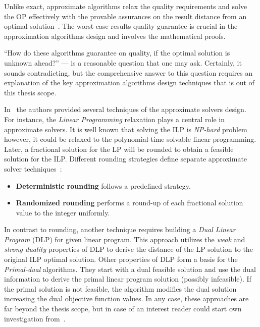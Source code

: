 Unlike exact, approximate algorithms relax the quality requirements and solve the OP effectively with the provable assurances on the result distance from an optimal solution~\cite{williamson2011design}. The worst-case results quality guarantee is crucial in the approximation algorithms design and involves the mathematical proofs.

``How do these algorithms guarantee on quality, if the optimal solution is unknown ahead?'' — is a reasonable question that one may ask. Certainly, it sounds contradicting, but the comprehensive answer to this question requires an explanation of the key approximation algorithms design techniques that is out of this thesis scope.

In~\cite{williamson2011design} the authors provided several techniques of the approximate solvers design. For instance, the \emph{Linear Programming} relaxation plays a central role in approximate solvers. It is well known that solving the ILP is \textit{NP-hard} problem however, it could be relaxed to the polynomial-time solvable linear programming. %
Later, a fractional solution for the LP will be rounded to obtain a feasible solution for the ILP. %
Different rounding strategies define separate approximate solver techniques~\cite{williamson2011design}: 
\begin{itemize}[itemsep=8pt]
	\item \textbf{Deterministic rounding} follows a predefined strategy.
	\item \textbf{Randomized rounding} performs a round-up of each fractional solution value to the integer uniformly.
\end{itemize}

In contrast to rounding, another technique requires building a \emph{Dual Linear Program} (DLP) for given linear program. This approach utilizes the \emph{weak} and \emph{strong duality} properties of DLP to derive the distance of the LP solution to the original ILP optimal solution. Other properties of DLP form a basis for the \emph{Primal-dual} algorithms. They start with a dual feasible solution and use the dual information to derive the primal linear program solution (possibly infeasible). If the primal solution is not feasible, the algorithm modifies the dual solution increasing the dual objective function values. In any case, these approaches are far beyond the thesis scope, but in case of an interest reader could start own investigation from~\cite{williamson2011design}. 

